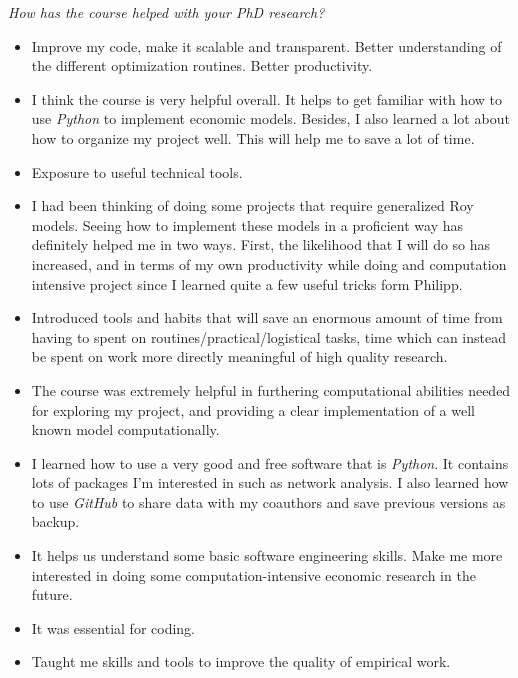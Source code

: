 \begin{boenumerate}
\begin{itemize}
\end{itemize}
\item \textit{How has the course helped with your PhD research?}
\begin{itemize}
\item Improve my code, make it scalable and transparent. Better understanding of the different optimization routines. Better productivity.
\item I think the course is very helpful overall. It helps to get familiar with how to use \textit{Python} to implement economic models. Besides, I also learned a lot about how to organize my project well. This will help me to save a lot of time.
\item Exposure to useful technical tools.
\item I had been thinking of doing some projects that require generalized Roy models. Seeing how to implement these models in a proficient way has definitely helped me in two ways. First, the likelihood that I will do so has increased, and in terms of my own productivity while doing and computation intensive project since I learned quite a few useful tricks form Philipp.
\item Introduced tools and habits that will save an enormous amount of time from having to spent on routines/practical/logistical tasks, time which can instead be spent on work more directly meaningful of high quality research. 
\item The course was extremely helpful in furthering computational abilities needed for exploring my project, and providing a clear implementation of a well known model computationally. 
\item I learned how to use a very good and free software that is \textit{Python}. It contains lots of packages I'm interested in such as network analysis. I also learned how to use \textit{GitHub} to share data with my coauthors and save previous versions as backup.
\item It helps us understand some basic software engineering skills. Make me more interested in doing some computation-intensive economic research in the future. 
\item It was essential for coding.
\item Taught me skills and tools to improve the quality of empirical work.
\end{itemize}

\end{boenumerate}
